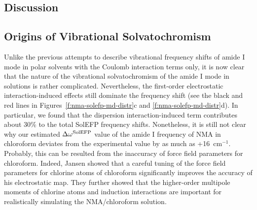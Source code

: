 \documentclass[b5paper,oneside,fleqn,11pt]{book}
\begin{document}
\begin{refsection}
\section{Discussion}

\subsection{Origins of Vibrational Solvatochromism\label{s:amide-I-discuss-origins}}

Unlike the previous attempts to describe vibrational
frequency shifts of amide I mode in polar solvents with the
Coulomb interaction terms only, it is now clear that the nature
of the vibrational solvatochromism of the amide I mode in
solutions is rather complicated. Nevertheless, the first\hyp{}order
electrostatic interaction\hyp{}induced effects still dominate the
frequency shift (see the black and red lines in Figures~\ref{f:nma-solefp-md-distr}c 
and \ref{f:nma-solefp-md-distr}d). 
In particular, we found that the dispersion interaction\hyp{}induced
term contributes about 30\% to the total SolEFP
frequency shifts. Nonetheless, it is still not clear why our
estimated $\Delta\omega^{\rm SolEFP}$ value of the amide I frequency of NMA in
chloroform deviates from the experimental value by as much
as +16~cm$^{-1}$. Probably, this can be resulted from the inaccuracy
of force field parameters for chloroform. Indeed, Jansen \citep{Jansen.JPCB.2014}
showed that a careful tuning of the force field parameters
for chlorine atoms of chloroform significantly improves the
accuracy of his electrostatic map. They further showed that
the higher\hyp{}order multipole moments of chlorine atoms and
induction interactions are important for realistically simulating
the NMA/chloroform solution.


\end{refsection}
\end{document}
